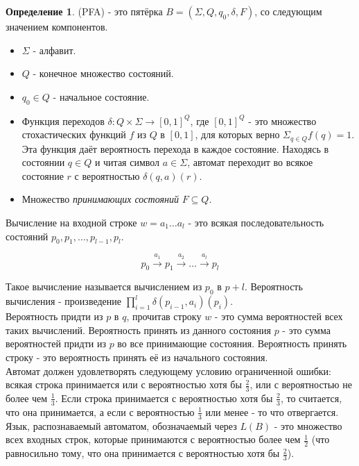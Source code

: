 \documentclass[a4paper]{article}
\theoremstyle{indented}
\theoremstyle{definition}
\newtheorem{defn}{Определение}
\theoremstyle{remark}
\DeclareMathOperator{\ra}{\rightarrow}
\begin{document}
\begin{defn}
     (PFA) - это пятёрка $B = (\Sigma, Q, q_0 , \delta, F )$, со следующим значением компонентов.

    \begin{itemize}
        \item $\Sigma$ - алфавит.
        \item $Q$ - конечное множество состояний. 
        \item $q_0 \in Q$ - начальное состояние.
        \item Функция переходов $\delta : Q \times \Sigma \ra [0, 1]^Q$, где $[0, 1]^Q$ - это множество стохастических функций $f$ из $Q$ в $[0, 1]$, для которых верно $\Sigma_{q\in Q} f (q) = 1$. Эта функция даёт вероятность перехода в каждое состояние. Находясь в состоянии $q \in Q$ и читая символ $a \in \Sigma$, автомат переходит во всякое состояние $r$ с вероятностью $\delta(q, a)(r)$.
        \item Множество \textit{принимающих состояний} $F \subseteq Q$.
    \end{itemize}

    Вычисление на входной строке $w = a_1 \ldots a_l$ - это всякая последовательность состояний $p_0,p_1,\ldots,p_{l-1},p_l$.

        \[
            p_0 \xrightarrow{a_1} p_1 \xrightarrow{a_2} \ldots \xrightarrow{a_l} p_l
        \]

    Такое вычисление называется вычислением из $p_0$ в $p+l$. Вероятность вычисления - произведение $\prod_{i=1}^l \delta(p_{i-1}, a_i)(p_i)$. \\ 

    Вероятность придти из $p$ в $q$, прочитав строку $w$ - это сумма вероятностей всех таких вычислений. Вероятность принять из данного состояния $p$ - это сумма вероятностей придти из $p$ во все принимающие состояния. Вероятность принять строку - это вероятность принять её из начального состояния. \\ 

    Автомат должен удовлетворять следующему условию ограниченной ошибки: всякая строка принимается или с вероятностью хотя бы $\frac{2}{3}$, или с вероятностью не более чем $\frac{1}{3}$. Если строка принимается с вероятностью хотя бы $\frac{2}{3}$, то считается, что она принимается, а если с вероятностью $\frac{1}{3}$ или менее - то что отвергается. Язык, распознаваемый автоматом, обозначаемый через $L(B)$ - это множество всех входных строк, которые принимаются с вероятностью более чем $\frac{1}{2}$ (что равносильно тому, что она принимается с вероятностью хотя бы $\frac{2}{3}$).
\end{defn}
\end{document}
